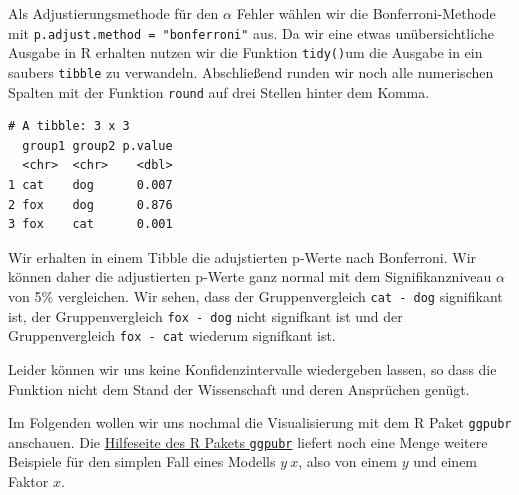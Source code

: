 \documentclass[
  letterpaper,
  DIV=11,
  oneside]{scrreport}
\newenvironment{Shaded}{\begin{snugshade}}{\end{snugshade}}
\newcommand{\AttributeTok}[1]{\textcolor[rgb]{0.40,0.45,0.13}{#1}}
\newcommand{\DecValTok}[1]{\textcolor[rgb]{0.68,0.00,0.00}{#1}}
\newcommand{\FunctionTok}[1]{\textcolor[rgb]{0.28,0.35,0.67}{#1}}
\newcommand{\NormalTok}[1]{\textcolor[rgb]{0.00,0.23,0.31}{#1}}
\newcommand{\SpecialCharTok}[1]{\textcolor[rgb]{0.37,0.37,0.37}{#1}}
\newcommand{\StringTok}[1]{\textcolor[rgb]{0.13,0.47,0.30}{#1}}
\begin{document}

Als Adjustierungsmethode für den \(\alpha\) Fehler wählen wir die
Bonferroni-Methode mit \texttt{p.adjust.method\ =\ "bonferroni"} aus. Da
wir eine etwas unübersichtliche Ausgabe in R erhalten nutzen wir die
Funktion \texttt{tidy()}um die Ausgabe in ein saubers \texttt{tibble} zu
verwandeln. Abschließend runden wir noch alle numerischen Spalten mit
der Funktion \texttt{round} auf drei Stellen hinter dem Komma.

\begin{Shaded}
\end{Shaded}

\begin{verbatim}
# A tibble: 3 x 3
  group1 group2 p.value
  <chr>  <chr>    <dbl>
1 cat    dog      0.007
2 fox    dog      0.876
3 fox    cat      0.001
\end{verbatim}

Wir erhalten in einem Tibble die adujstierten p-Werte nach Bonferroni.
Wir können daher die adjustierten p-Werte ganz normal mit dem
Signifikanzniveau \(\alpha\) von 5\% vergleichen. Wir sehen, dass der
Gruppenvergleich \texttt{cat\ -\ dog} signifikant ist, der
Gruppenvergleich \texttt{fox\ -\ dog} nicht signifkant ist und der
Gruppenvergleich \texttt{fox\ -\ cat} wiederum signifkant ist.

Leider können wir uns keine Konfidenzintervalle wiedergeben lassen, so
dass die Funktion nicht dem Stand der Wissenschaft und deren Ansprüchen
genügt.

Im Folgenden wollen wir uns nochmal die Visualisierung mit dem R Paket
\texttt{ggpubr} anschauen. Die
\href{https://rpkgs.datanovia.com/ggpubr/index.html}{Hilfeseite des R
Pakets \texttt{ggpubr}} liefert noch eine Menge weitere Beispiele für
den simplen Fall eines Modells \(y ~ x\), also von einem \(y\) und einem
Faktor \(x\).
\end{document}
